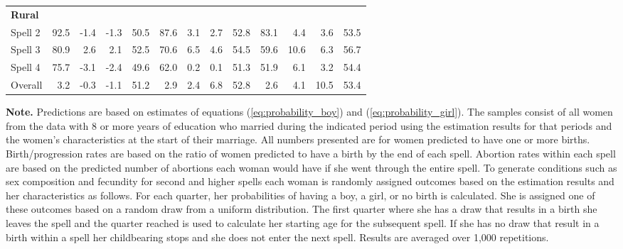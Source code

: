 \begin{table}[htbp]
\begin{center}
\begin{scriptsize}
\begin{threeparttable}
\begin{tabular} {@{} l D{.}{.}{2.1} D{.}{.}{2.1} D{.}{.}{2.1} D{.}{.}{2.1}  D{.}{.}{2.1} D{.}{.}{2.1} D{.}{.}{2.1} D{.}{.}{2.1} D{.}{.}{2.1} D{.}{.}{2.1} D{.}{.}{2.1} D{.}{.}{2.1}  @{}}
\addlinespace 
\bf Rural        &  \\                                                                                  
Spell 2          &       92.5   &  -1.4   &  -1.3   &  50.5   &       87.6   &  3.1    &  2.7  &  52.8   &       83.1   &  4.4    &  3.6   &  53.5      \\
Spell 3          &       80.9   &  2.6    &  2.1    &  52.5   &       70.6   &  6.5    &  4.6  &  54.5   &       59.6   &  10.6   &  6.3   &  56.7      \\
Spell 4          &       75.7   &  -3.1   &  -2.4   &  49.6   &       62.0   &  0.2    &  0.1  &  51.3   &       51.9   &  6.1    &  3.2   &  54.4      \\
Overall &       3.2    &  -0.3   &  -1.1   &  51.2   &       2.9    &  2.4    &  6.8  &  52.8   &       2.6    &  4.1    &  10.5  &  53.4      \\
\bottomrule
\end{tabular}                        
\begin{tablenotes} \tiny
\item \hspace*{-0.5em} \textbf{Note.} Predictions are based on estimates of equations 
(\ref{eq:probability_boy}) and (\ref{eq:probability_girl}).
The samples consist of all women from the data with 8 or more years of education who
married during the indicated period using the estimation results for that periods 
and the women's characteristics at the start of their marriage. 
All numbers presented are for women predicted to have one or more births.
Birth/progression rates are based on the ratio of women predicted to have a birth 
by the end of each spell.
Abortion rates within each spell are based on the predicted number of abortions each
woman would have if she went through the entire spell.
To generate conditions such as sex composition and fecundity for second and higher spells 
each woman is randomly assigned outcomes based on the estimation results and
her characteristics as follows.
For each quarter, her probabilities of having a boy, a girl, or no birth is calculated.
She is assigned one of these outcomes based on a random draw from a uniform distribution.
The first quarter where she has a draw that results in a birth she leaves the spell
and the quarter reached is used to calculate her starting age for the subsequent spell.
If she has no draw that result in a birth within a spell her childbearing stops and
she does not enter the next spell.
Results are averaged over 1,000 repetitions.

\end{tablenotes}
\end{threeparttable}
\end{scriptsize}
\end{center}
\end{table}
